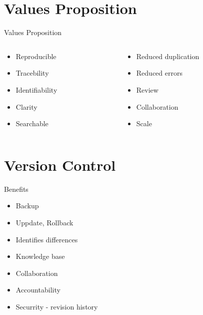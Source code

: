 \documentclass{beamer}
\begin{document}
\section{Values Proposition}
\begin{frame}{Values Proposition}
  \begin{columns}
    \begin{column}{0.5\textwidth}
      \begin{itemize}
        \item Reproducible\pause
        \item Tracebility\pause
        \item Identifiability\pause
        \item Clarity\pause
        \item Searchable\pause 
      \end{itemize}          
    \end{column}
    \begin{column}{0.5\textwidth}
      \begin{itemize}
        \item Reduced duplication\pause
        \item Reduced errors\pause
        \item Review\pause
        \item Collaboration\pause
        \item Scale
      \end{itemize}
    \end{column}
  \end{columns}
\end{frame}

\section{Version Control}
\begin{frame}{Benefits}
  \begin{itemize}
    \item Backup\pause
    \item Uppdate, Rollback\pause
    \item Identifies differences\pause
    \item Knowledge base\pause
    \item Collaboration\pause
    \item Accountability \pause
    \item Securrity - revision history
  \end{itemize}
\end{frame}
\end{document}

